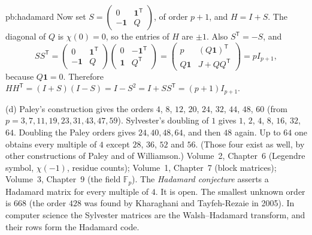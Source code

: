 \begin{solution}{pb:hadamard}
Now set $S=\begin{pmatrix}0&\mathbf1^{\mathsf T}\\-\mathbf1&Q\end{pmatrix}$, of order $p+1$, and $H=I+S$. The diagonal of
$Q$ is $\chi(0)=0$, so the entries of $H$ are $\pm1$. Also $S^{\mathsf T}=-S$, and
\[
SS^{\mathsf T}=\begin{pmatrix}0&\mathbf1^{\mathsf T}\\-\mathbf1&Q\end{pmatrix}\begin{pmatrix}0&-\mathbf1^{\mathsf T}\\
\mathbf1&Q^{\mathsf T}\end{pmatrix}=\begin{pmatrix}p&(Q\mathbf1)^{\mathsf T}\\Q\mathbf1&J+QQ^{\mathsf T}\end{pmatrix}=pI_{p+1},
\]
because $Q\mathbf1=0$. Therefore $HH^{\mathsf T}=(I+S)(I-S)=I-S^2=I+SS^{\mathsf T}=(p+1)I_{p+1}$.

(d) Paley's construction gives the orders $4$, $8$, $12$, $20$, $24$, $32$, $44$, $48$, $60$ (from $p=3,7,11,19,23,31,43,47,59$). Sylvester's doubling
of $1$ gives $1$, $2$, $4$, $8$, $16$, $32$, $64$. Doubling the Paley orders gives $24,40,48,64$, and then $48$ again. Up to $64$ one obtains
every multiple of $4$ except $28$, $36$, $52$ and $56$. (Those four exist as well, by other constructions of Paley and of Williamson.)
\tools Volume~2, Chapter~6 (Legendre symbol, $\chi(-1)$, residue counts); Volume~1, Chapter~7 (block matrices); Volume~3,
Chapter~9 (the field $\mathbb F_p$).
\leads The \emph{Hadamard conjecture} asserts a Hadamard matrix for every multiple of $4$. It is open. The
smallest unknown order is $668$ (the order $428$ was found by Kharaghani and Tayfeh-Rezaie in 2005). In computer science the
Sylvester matrices are the Walsh--Hadamard transform, and their rows form the Hadamard code.
\end{solution}

